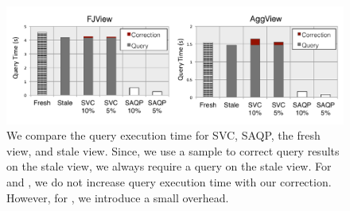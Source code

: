 \begin{figure}[h]
\centering
 \includegraphics[width=\columnwidth]{exp/total_time_agg_view.pdf}
 \caption{We compare the query execution time for SVC, SAQP, the fresh view, and stale view. Since, we use a sample to correct query results on the stale view, we always require a query on the stale view. For \fjview and \spview, we do not increase query execution time with our correction. However, for \aggview, we introduce a small overhead.\label{exp10overheads}}
\end{figure}

